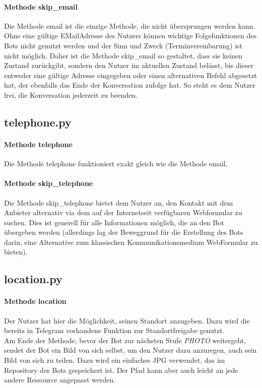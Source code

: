             \paragraph{Methode skip\_email}
                Die Methode email ist die einzige Methode, die nicht übersprungen werden kann. Ohne eine gültige E\-Mail\-Adresse des Nutzers können wichtige Folgefunktionen des Bots nicht genutzt werden und der Sinn und Zweck (Terminvereinbarung) ist nicht möglich. Daher ist die Methode skip\_email so gestaltet, dass sie keinen Zustand zurückgibt, sondern den Nutzer im aktuellen Zustand belässt, bis dieser entweder eine gültige Adresse eingegeben oder einen alternativen Befehl abgesetzt hat, der ebenfalls das Ende der Konversation zufolge hat. So steht es dem Nutzer frei, die Konversation jederzeit zu beenden. 
        
            
        \subsection{telephone.py}
            \paragraph{Methode telephone}
                Die Methode telephone funktioniert exakt gleich wie die Methode email.

            \paragraph{Methode skip\_telephone}
                Die Methode skip\_telephone bietet dem Nutzer an, den Kontakt mit dem Anbieter alternativ via dem auf der Internetseit verfügbaren Webformular zu suchen. Dies ist generell für alle Informationen möglich, die an den Bot übergeben werden (allerdings lag der Beweggrund für die Erstellung des Bots darin, eine Alternative zum klassischen Kommunikationsmedium Web\-Formular zu bieten).
        
        
        \subsection{location.py}
            \paragraph{Methode location}
                Der Nutzer hat hier die Möglichkeit, seinen Standort anzugeben. Dazu wird die bereits in Telegram vorhandene Funktion zur Standortfreigabe genutzt. \\
                Am Ende der Methode, bevor der Bot zur nächsten Stufe \emph{PHOTO} weitergeht, sendet der Bot ein Bild von sich selbst, um den Nutzer dazu anzuregen, auch sein Bild von sich zu teilen. Dazu wird ein einfaches JPG verwendet, das im Repository des Bots gespeichert ist. Der Pfad kann aber auch leicht an jede andere Ressource angepasst werden.

